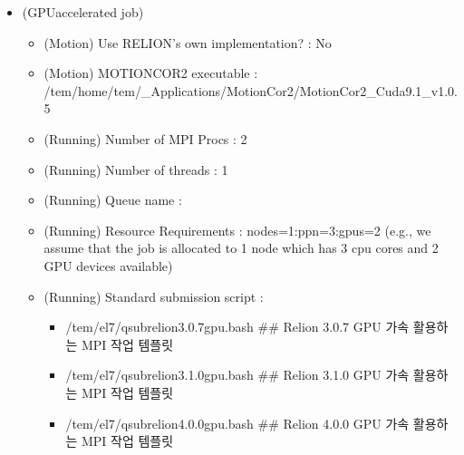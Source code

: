 \documentclass[a4paper,11pt,english]{sphinxmanual}
\begin{document}
\begin{itemize}
\item {} 
\sphinxAtStartPar
{} (GPU\sphinxhyphen{}accelerated job)
\begin{itemize}
\item {} 
\sphinxAtStartPar
(Motion) Use RELION’s own implementation? : No

\item {} 
\sphinxAtStartPar
(Motion) MOTIONCOR2 executable : /tem/home/tem/\_Applications/MotionCor2/MotionCor2\_Cuda9.1\_v1.0.5

\item {} 
\sphinxAtStartPar
(Running) Number of MPI Procs : 2

\item {} 
\sphinxAtStartPar
(Running) Number of threads : 1

\item {} 
\sphinxAtStartPar
(Running) Queue name : 

\item {} 
\sphinxAtStartPar
(Running) Resource Requirements : nodes=1:ppn=3:gpus=2  (e.g., we assume that the job is allocated to 1 node which has 3 cpu cores and 2 GPU devices available)

\item {} 
\sphinxAtStartPar
(Running) Standard submission script :
\begin{itemize}
\item {} 
\sphinxAtStartPar
/tem/el7/qsub\sphinxhyphen{}relion\sphinxhyphen{}3.0.7\sphinxhyphen{}gpu.bash           \#\# Relion 3.0.7 GPU 가속 활용하는 MPI 작업 템플릿

\item {} 
\sphinxAtStartPar
/tem/el7/qsub\sphinxhyphen{}relion\sphinxhyphen{}3.1.0\sphinxhyphen{}gpu.bash           \#\# Relion 3.1.0 GPU 가속 활용하는 MPI 작업 템플릿

\item {} 
\sphinxAtStartPar
/tem/el7/qsub\sphinxhyphen{}relion\sphinxhyphen{}4.0.0\sphinxhyphen{}gpu.bash           \#\# Relion 4.0.0 GPU 가속 활용하는 MPI 작업 템플릿

\end{itemize}

\end{itemize}

\end{itemize}
\end{document}
